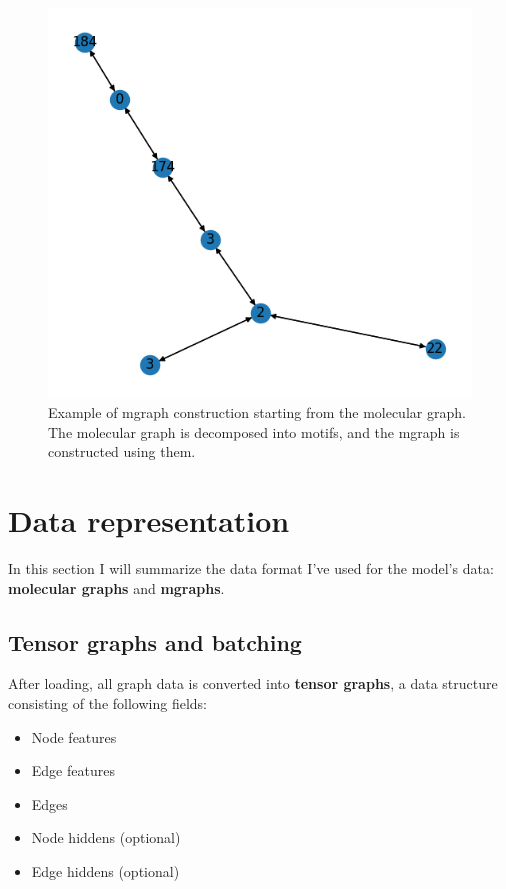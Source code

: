 \documentclass{article}
\begin{document}
\begin{figure}[h]
\includegraphics[width=1.0\textwidth]{./img/mgraph3.png}
\caption{
Example of mgraph construction starting from the molecular graph.\\
The molecular graph is decomposed into motifs, and the mgraph is constructed using them.
}
\end{figure}

\section{Data representation}

In this section I will summarize the data format I've used for the model's data: \textbf{molecular graphs} and \textbf{mgraphs}.

\subsection{Tensor graphs and batching}

After loading, all graph data is converted into \textbf{tensor graphs}, a data structure consisting of the following fields:

\begin{itemize}
\item Node features
\item Edge features
\item Edges
\item Node hiddens (optional)
\item Edge hiddens (optional)
\end{itemize}
\end{document}
